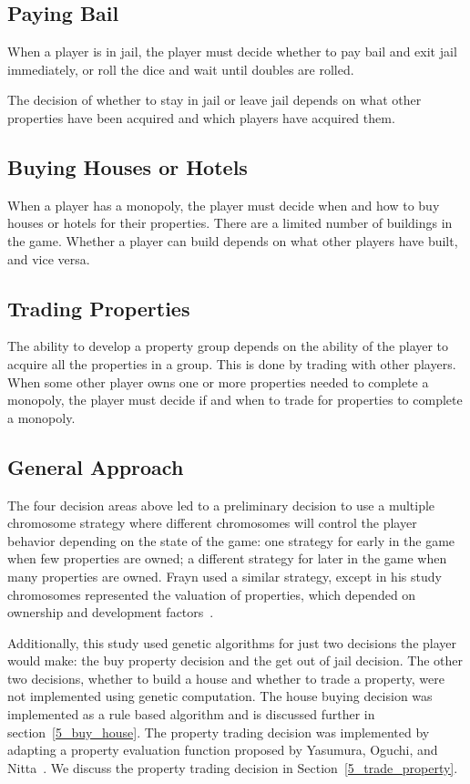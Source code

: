 \subsection{Paying Bail}
When a player is in jail, the player must decide whether to pay bail and exit
jail immediately, or roll the dice and wait until doubles are rolled.

The decision of whether to stay in jail or leave jail depends on what other
properties have been acquired and which players have acquired them.

\subsection{Buying Houses or Hotels}
When a player has a monopoly, the player must decide when and how to buy houses
or hotels for their properties. There are a limited number of buildings in the
game. Whether a player can build depends on what other players have built, and
vice versa.

\subsection{Trading Properties}
The ability to develop a property group depends on the ability of the player to
acquire all the properties in a group. This is done by trading with other
players. When some other player owns one or more properties needed to complete a
monopoly, the player must decide if and when to trade for properties to complete
a monopoly.

\subsection{General Approach}

The four decision areas above led to a preliminary decision to use a multiple
chromosome strategy where different chromosomes will control the player behavior
depending on the state of the game: one strategy for early in the game when few
properties are owned; a different strategy for later in the game when many
properties are owned. Frayn used a similar strategy, except in his study
chromosomes represented the valuation of properties, which depended on ownership
and development factors~\cite{DBLP:conf/cig/Frayn05}.

Additionally, this study used genetic algorithms for just two decisions the
player would make: the buy property decision and the get out of jail decision.
The other two decisions, whether to build a house and whether to trade a
property, were not implemented using genetic computation. The house buying
decision was implemented as a rule based algorithm and is discussed further in
section~\ref{5_buy_house}. The property trading decision was implemented by
adapting a property evaluation function proposed by Yasumura, Oguchi, and
Nitta~\cite{Yasumura2001Negotiate}. We discuss the property trading decision in
Section~\ref{5_trade_property}.

